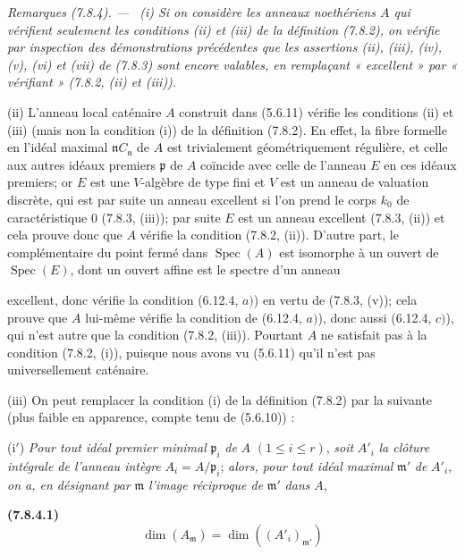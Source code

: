 \documentclass[10pt,oneside]{book}
\makeatletter
\newcommand{\oldpage}[2][]{%
  \setcounter{footnote}{0}%
  \marginpar{\scriptsize\textbf{#1}~|~#2}\ignorespaces}
\newenvironment{env}[1][]{\par\medskip\noindent\textbf{(#1)}\ }{\par}
\newenvironment{remarks}[1][]{%
  \par\medskip\noindent\itshape Remarques (#1). ---\ }{\par}
\newcommand{\EGAReaderTarget}[2]{\hypertarget{#1}{}\@bsphack\begingroup\def\@currentHref{#1}\label{#2}\endgroup\@esphack}
\makeatother
\begin{document}
\begin{remarks}[7.8.4]
\EGAReaderTarget{ega4.c04.item.7-8-4}{IV.2.s7.8.4-fr}
\upshape
(i) Si on considère les anneaux noethériens $A$ qui vérifient seulement les
conditions (ii) et (iii) de la définition (7.8.2), on vérifie par inspection
des démonstrations précédentes que les assertions (ii), (iii), (iv), (v), (vi)
et (vii) de (7.8.3) sont encore valables, en remplaçant « excellent » par
« vérifiant » (7.8.2, (ii) et (iii)).

(ii) L'anneau local caténaire $A$ construit dans (5.6.11) vérifie les
conditions (ii) et (iii) (mais non la condition (i)) de la définition (7.8.2).
En effet, la fibre formelle en l'idéal maximal $\mathfrak n C_{\mathfrak n}$ de
$A$ est trivialement géométriquement régulière, et celle aux autres idéaux
premiers $\mathfrak p$ de $A$ coïncide avec celle de l'anneau $E$ en ces idéaux
premiers; or $E$ est une $V$-algèbre de type fini et $V$ est un anneau de
valuation discrète, qui est par suite un anneau excellent si l'on prend le
corps $k_0$ de caractéristique $0$ (7.8.3, (iii)); par suite $E$ est un anneau
excellent (7.8.3, (ii)) et cela prouve donc que $A$ vérifie la condition (7.8.2,
(ii)). D'autre part, le complémentaire du point fermé dans
$\operatorname{Spec}(A)$ est isomorphe à un ouvert de $\operatorname{Spec}(E)$,
dont un ouvert affine est le spectre d'un anneau

\oldpage[IV-2]{217}

excellent, donc vérifie la condition (6.12.4, $a)$) en vertu de (7.8.3, (v));
cela prouve que $A$ lui-même vérifie la condition de (6.12.4, $a)$), donc aussi
(6.12.4, $c)$), qui n'est autre que la condition (7.8.2, (iii)). Pourtant $A$
ne satisfait pas à la condition (7.8.2, (i)), puisque nous avons vu (5.6.11)
qu'il n'est pas universellement caténaire.

(iii) On peut remplacer la condition (i) de la définition (7.8.2) par la
suivante (plus faible en apparence, compte tenu de (5.6.10)) :

(i$'$) \emph{Pour tout idéal premier minimal} $\mathfrak p_i$ \emph{de} $A$
$(1\leq i\leq r)$, \emph{soit} $A'_i$ \emph{la clôture intégrale de l'anneau
intègre} $A_i=A/\mathfrak p_i$; \emph{alors, pour tout idéal maximal}
$\mathfrak m'$ \emph{de} $A'_i$, \emph{on a, en désignant par} $\mathfrak m$
\emph{l'image réciproque de} $\mathfrak m'$ \emph{dans} $A$,
\begin{env}[7.8.4.1]
\label{IV.2.s7.8.4.1-fr}
\[
\dim(A_{\mathfrak m})=\dim((A'_i)_{\mathfrak m'})
\]
\end{env}


\end{remarks}
\end{document}
